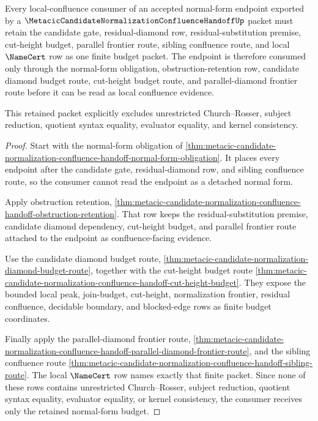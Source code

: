 \begin{theorem}
\label{thm:metacic-candidate-normalization-normal-form-budget}
Every local-confluence consumer of an accepted normal-form endpoint exported by
a $\MetacicCandidateNormalizationConfluenceHandoffUp$ packet must retain the
candidate gate, residual-diamond row, residual-substitution premise,
cut-height budget, parallel frontier route, sibling confluence route, and local
$\NameCert$ row as one finite budget packet. The endpoint is therefore consumed
only through the normal-form obligation, obstruction-retention row, candidate
diamond budget route, cut-height budget route, and parallel-diamond frontier
route before it can be read as local confluence evidence.

This retained packet explicitly excludes unrestricted Church--Rosser, subject
reduction, quotient syntax equality, evaluator equality, and kernel
consistency.
\end{theorem}
\begin{proof}
Start with the normal-form obligation of
\autoref{thm:metacic-candidate-normalization-confluence-handoff-normal-form-obligation}.
It places every endpoint after the candidate gate, residual-diamond row, and
sibling confluence route, so the consumer cannot read the endpoint as a detached
normal form.

Apply obstruction retention,
\autoref{thm:metacic-candidate-normalization-confluence-handoff-obstruction-retention}.
That row keeps the residual-substitution premise, candidate diamond dependency,
cut-height budget, and parallel frontier route attached to the endpoint as
confluence-facing evidence.

Use the candidate diamond budget route,
\autoref{thm:metacic-candidate-normalization-diamond-budget-route}, together
with the cut-height budget route
\autoref{thm:metacic-candidate-normalization-confluence-handoff-cut-height-budget}.
They expose the bounded local peak, join-budget, cut-height, normalization
frontier, residual confluence, decidable boundary, and blocked-edge rows as
finite budget coordinates.

Finally apply the parallel-diamond frontier route,
\autoref{thm:metacic-candidate-normalization-confluence-handoff-parallel-diamond-frontier-route},
and the sibling confluence route
\autoref{thm:metacic-candidate-normalization-confluence-handoff-sibling-route}.
The local $\NameCert$ row names exactly that finite packet. Since none of these
rows contains unrestricted Church--Rosser, subject reduction, quotient syntax
equality, evaluator equality, or kernel consistency, the consumer receives only
the retained normal-form budget.
\end{proof}

